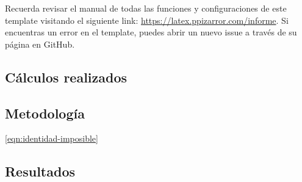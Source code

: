 	Recuerda revisar el manual de todas las funciones y configuraciones de este template visitando el siguiente link: \url{https://latex.ppizarror.com/informe}. Si encuentras un error en el template, puedes abrir un nuevo issue a través de su página en GitHub.


\clearpage



\begin{appendixd}

	\section{Cálculos realizados}

	\subsection{Metodología}

	\lipsum[1] \eqref{eqn:identidad-imposible}


	\subsection{Resultados}

	\lipsum[10]


\end{appendixd}
